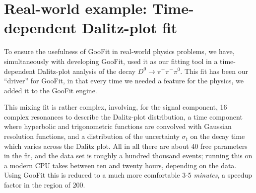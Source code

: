 \section{Real-world example: Time-dependent Dalitz-plot fit}
\label{sec:tddp}

To ensure the usefulness of GooFit in real-world physics problems,
we have, simultaneously with developing GooFit, used it as our fitting
tool in a time-dependent Dalitz-plot analysis of the decay $D^0\to\pi^+\pi^-\pi^0$. 
This fit has been our ``driver'' for GooFit, in that every
time we needed a feature for the physics, we added it to the GooFit
engine. 

This mixing fit is rather complex, involving, for the signal component, 
16 complex resonances to describe the Dalitz-plot distribution,
a time component where hyperbolic and trigonometric functions
are convolved with Gaussian resolution functions, and a distribution
of the uncertainty $\sigma_t$ on the decay time which varies across
the Dalitz plot. All in all there are about 40 free parameters in the
fit, and the data set is roughly a hundred thousand events; running this
on a modern CPU takes between ten and twenty hours, depending on the 
data. Using GooFit this is reduced to a much more comfortable 3-5 \emph{minutes},
a speedup factor in the region of 200. 


